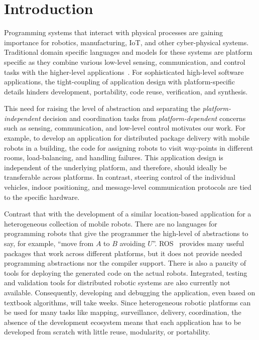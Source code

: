 \section{Introduction}
\label{sec:intro}
Programming systems that interact with physical processes are gaining importance for robotics, manufacturing, IoT, and other cyber-physical systems. Traditional domain specific languages and models for these systems are platform specific as they combine various low-level sensing, communication, and control tasks with the higher-level applications~\cite{nordmann2014robotics}. For sophisticated high-level software applications, the tight-coupling of application design with platform-specific details hinders development, portability, code reuse,  verification, and synthesis.

This need for raising the level of abstraction and separating the \emph{platform-independent} decision and coordination tasks from \emph{platform-dependent} concerns such as sensing, communication, and low-level control motivates our work. For example, to develop an application for distributed package delivery with mobile robots in a building, the code for assigning robots to visit way-points in different rooms, load-balancing, and handling failures.  This application design is independent of the underlying platform, and therefore, should ideally be transferable across platforms. In contrast, steering control of the individual vehicles, indoor positioning, and message-level communication protocols are tied to the specific hardware.

%


Contrast that with the development of a similar location-based application for a heterogeneous collection of mobile robots. 
There are no languages for programming  robots that give the programmer the high-level of abstractions to say, for example, ``move from $A$ to $B$ avoiding $U$''. 
ROS~\cite{ros} provides many useful packages that work across different platforms, but it does not provide needed programming abstractions nor the compiler support. 
There is also a paucity of tools for deploying the generated code on the actual robots. 
Integrated, testing and validation tools for distributed robotic systems are also currently not available. 
Consequently, developing and debugging the application, even based on textbook algorithms, will take weeks. 
Since heterogeneous robotic platforms can be used for many tasks like mapping, surveillance, delivery, coordination,  the absence of the development ecosystem means that each application has to be developed from scratch with little reuse, modularity, or portability. 


